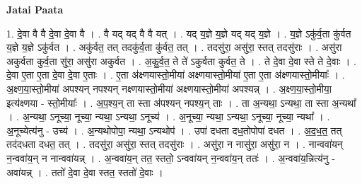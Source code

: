 \documentclass[17pt]{extarticle}
\begin{document}
\textbf{Jatai Paata} \newline

1. दे॒वा वै वै दे॒वा दे॒वा वै । . वै यद् यद् वै वै यत् । . यद् य॒ज्ञे य॒ज्ञे यद् यद् य॒ज्ञे । . य॒ज्ञे ऽकु॑र्व॒ता कु॑र्वत य॒ज्ञे य॒ज्ञे ऽकु॑र्वत । . अकु॑र्वत॒ तत् तदकु॑र्व॒ता कु॑र्वत॒ तत् । . तदसु॑रा॒ असु॑रा॒ स्तत् तदसु॑राः । . असु॑रा अकुर्वता कुर्व॒ता सु॑रा॒ असु॑रा अकुर्वत । . अ॒कु॒र्व॒त॒ ते ते॑ ऽकुर्वता कुर्वत॒ ते । . ते दे॒वा दे॒वा स्ते ते दे॒वाः । . दे॒वा ए॒ता ए॒ता दे॒वा दे॒वा ए॒ताः । . ए॒ता अ॑क्ष्णयास्तो॒मीया॑ अक्ष्णयास्तो॒मीया॑ ए॒ता ए॒ता अ॑क्ष्णयास्तो॒मीयाः᳚ । . अ॒क्ष्ण॒या॒स्तो॒मीया॑ अपश्यन् नपश्यन् नक्ष्णयास्तो॒मीया॑ अक्ष्णयास्तो॒मीया॑ अपश्यन्न् । . अ॒क्ष्ण॒या॒स्तो॒मीया॒ इत्य॑क्ष्णया - स्तो॒मीयाः᳚ । . अ॒प॒श्य॒न् ता स्ता अ॑पश्यन् नपश्य॒न् ताः । . ता अ॒न्यथा॒ ऽन्यथा॒ ता स्ता अ॒न्यथा᳚ । . अ॒न्यथा॒ ऽनूच्या॒ नूच्या॒ न्यथा॒ ऽन्यथा॒ ऽनूच्य॑ । . अ॒नूच्या॒ न्यथा॒ ऽन्यथा॒ ऽनूच्या॒ नूच्या॒ न्यथा᳚ । . अ॒नूच्येत्य॑नु - उच्य॑ । . अ॒न्यथोपोपा॒ न्यथा॒ ऽन्यथोप॑ । . उपा॑ दधता दध॒तोपोपा॑ दधत । . अ॒द॒ध॒त॒ तत् तद॑दधता दधत॒ तत् । . तदसु॑रा॒ असु॑रा॒ स्तत् तदसु॑राः । . असु॑रा॒ न नासु॑रा॒ असु॑रा॒ न । . नान्ववा॑यन् न॒न्ववा॑य॒न् न नान्ववा॑यन्न् । . अ॒न्ववा॑य॒न् तत॒ स्ततो॒ ऽन्ववा॑यन् न॒न्ववा॑य॒न् ततः॑ । . अ॒न्ववा॑य॒न्नित्य॑नु - अवा॑यन्न् । . ततो॑ दे॒वा दे॒वा स्तत॒ स्ततो॑ दे॒वाः । \newline
\end{document}
